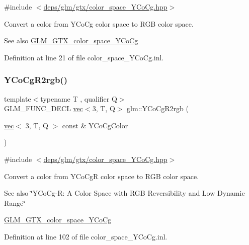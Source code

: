 {\ttfamily \#include $<$\hyperlink{color__space__YCoCg_8hpp}{deps/glm/gtx/color\+\_\+space\+\_\+\+Y\+Co\+Cg.\+hpp}$>$}

Convert a color from Y\+Co\+Cg color space to R\+GB color space. \begin{DoxySeeAlso}{See also}
\hyperlink{group__gtx__color__space__YCoCg}{G\+L\+M\+\_\+\+G\+T\+X\+\_\+color\+\_\+space\+\_\+\+Y\+Co\+Cg} 
\end{DoxySeeAlso}


Definition at line 21 of file color\+\_\+space\+\_\+\+Y\+Co\+Cg.\+inl.

\mbox{\label{group__gtx__color__space__YCoCg_gaf8d30574c8576838097d8e20c295384a}} 
\subsubsection{\texorpdfstring{Y\+Co\+Cg\+R2rgb()}{YCoCgR2rgb()}}
{\footnotesize\ttfamily template$<$typename T , qualifier Q$>$ \\
G\+L\+M\+\_\+\+F\+U\+N\+C\+\_\+\+D\+E\+CL \hyperlink{structglm_1_1vec}{vec}$<$3, T, Q$>$ glm\+::\+Y\+Co\+Cg\+R2rgb (\begin{DoxyParamCaption}\item[{\hyperlink{structglm_1_1vec}{vec}$<$ 3, T, Q $>$ const \&}]{Y\+Co\+Cg\+Color }\end{DoxyParamCaption})}



{\ttfamily \#include $<$\hyperlink{color__space__YCoCg_8hpp}{deps/glm/gtx/color\+\_\+space\+\_\+\+Y\+Co\+Cg.\+hpp}$>$}

Convert a color from Y\+Co\+CgR color space to R\+GB color space. \begin{DoxySeeAlso}{See also}
\char`\"{}\+Y\+Co\+Cg-\/\+R\+: A Color Space with R\+G\+B Reversibility and Low Dynamic Range\char`\"{} 

\hyperlink{group__gtx__color__space__YCoCg}{G\+L\+M\+\_\+\+G\+T\+X\+\_\+color\+\_\+space\+\_\+\+Y\+Co\+Cg} 
\end{DoxySeeAlso}


Definition at line 102 of file color\+\_\+space\+\_\+\+Y\+Co\+Cg.\+inl.


